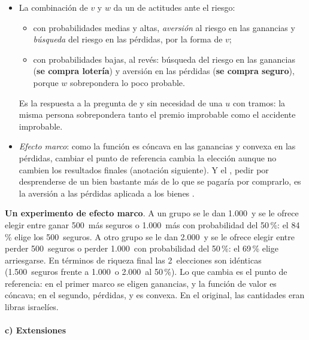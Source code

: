 \documentclass[11pt]{article}
\begin{document}
\begin{itemize}
\item La combinación de $v$ y $w$ da un  de actitudes ante el riesgo\nocite{TverskyKahneman1992Advances}:
  \begin{itemize}
  \item con probabilidades medias y altas, \emph{aversión} al riesgo en las ganancias y \emph{búsqueda} del riesgo en las pérdidas, por la forma de $v$;
  \item con probabilidades bajas, al revés: búsqueda del riesgo en las ganancias (\textbf{se compra lotería}) y aversión en las pérdidas (\textbf{se compra seguro}), porque $w$ sobrepondera lo poco probable.
  \end{itemize}
  Es la respuesta a la pregunta de  y  sin necesidad de una $u$ con tramos: la misma persona sobrepondera tanto el premio improbable como el accidente improbable.
\item \emph{Efecto marco}: como la función es cóncava en las ganancias y convexa en las pérdidas, cambiar el punto de referencia cambia la elección aunque no cambien los resultados finales (anotación siguiente). Y el , pedir por desprenderse de un bien bastante más de lo que se pagaría por comprarlo, es la aversión a las pérdidas aplicada a los bienes\nocite{KahnemanKnetschThaler1990Endowment} .
\end{itemize}

\begin{anotaciones}
\textbf{Un experimento de efecto marco}\nocite{KahnemanTversky1979Prospect}. A un grupo se le dan 1.000~y se le ofrece elegir entre ganar 500~más seguros o 1.000~más con probabilidad del 50\,\%: el 84\,\% elige los 500~seguros. A otro grupo se le dan 2.000~y se le ofrece elegir entre perder 500~seguros o perder 1.000~con probabilidad del 50\,\%: el 69\,\% elige arriesgarse. En términos de riqueza final las 2~elecciones son idénticas (1.500~seguros frente a 1.000~o 2.000~al 50\,\%). Lo que cambia es el punto de referencia: en el primer marco se eligen ganancias, y la función de valor es cóncava; en el segundo, pérdidas, y es convexa. En el original, las cantidades eran libras israelíes.
\end{anotaciones}

\paragraph{c) Extensiones}
\end{document}
